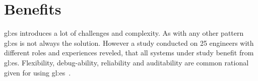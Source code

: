 




\section{Benefits}

\gls{gl:es} introduces a lot of challenges and complexity. As with any other pattern \gls{gl:es} is not always the solution. However a study conducted on 25 engineers with different roles and experiences reveled, that all systems under study benefit from \gls{gl:es}. Flexibility, debug-ability, reliability and auditability are common rational given for using \gls{gl:es}~\citep{OVEREEM2021110970}.

